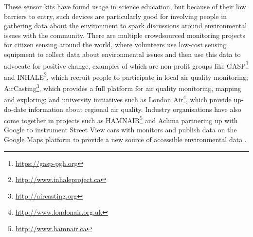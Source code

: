These sensor kits have found usage in science education, but because of their low barriers to entry, such devices are particularly good for involving people in gathering data about the environment to spark discussions around environmental issues with the community. There are multiple crowdsourced monitoring projects for citizen sensing around the world, where volunteers use low-cost sensing equipment to collect data about environmental issues and then use this data to advocate for positive change, examples of which are non-profit groups like GASP\footnote{\url{https://gasp-pgh.org}} and INHALE\footnote{\url{http://www.inhaleproject.ca}}, which recruit people to participate in local air quality monitoring; AirCasting\footnote{\url{http://aircasting.org}}, which provides a full platform for air quality monitoring, mapping and exploring; and university initiatives such as London Air\footnote{\url{http://www.londonair.org.uk}}, which provide up-do-date information about regional air quality. Industry organisations have also come together in projects such as HAMNAIR\footnote{\url{http://www.hamnair.ca}} and Aclima partnering up with Google to instrument Street View cars with monitors and publish data on the Google Maps platform to provide a new source of accessible environmental data \citep{aclima_aclima_2018}.

